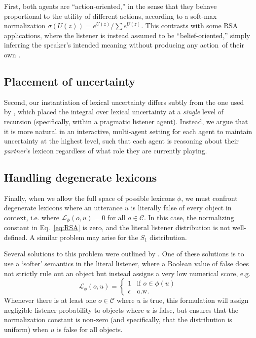 \documentclass[10pt, jou, floatsintext]{apa7}
\begin{document}
First, both agents are ``action-oriented,'' in the sense that they behave proportional to the utility of different actions, according to a soft-max normalization $\sigma(U(z)) = e^{U(z)}/\sum e^{U(z)}$.
This contrasts with some RSA applications, where the listener is instead assumed to be ``belief-oriented,'' simply inferring the speaker's intended meaning without producing any action of their own \cite{qing2015variations}.

\subsection{Placement of uncertainty}

Second, our instantiation of lexical uncertainty differs subtly from the one used by , which placed the integral over lexical uncertainty at a \emph{single} level of recursion (specifically, within a pragmatic listener agent).
Instead, we argue that it is more natural in an interactive, multi-agent setting for each agent to maintain uncertainty at the highest level, such that each agent is reasoning about their \emph{partner}'s lexicon regardless of what role they are currently playing.


\subsection{Handling degenerate lexicons}

Finally, when we allow the full space of possible lexicons $\phi$, we must confront degenerate lexicons where an utterance $u$ is literally false of every object in context, i.e. where $\mathcal{L}_\phi(o, u) = 0$ for all $o\in \mathcal{C}$. 
In this case, the normalizing constant in Eq.~\ref{eq:RSA} is zero, and the literal listener distribution is not well-defined.
A similar problem may arise for the $S_1$ distribution.

Several solutions to this problem were outlined by .
One of these solutions is to use a `softer' semantics in the literal listener, where a Boolean value of false does not strictly rule out an object but instead assigns a very low numerical score, e.g. 
$$\mathcal{L}_\phi(o,u) = \left\{ \begin{array} {rl} 1 & \textrm{if }o \in \phi(u) \\ \epsilon & \textrm{o.w.} \end{array}\right.$$
Whenever there is at least one $o\in\mathcal{C}$ where $u$ is true, this formulation will assign negligible listener probability to objects where $u$ is false, but ensures that the normalization constant is non-zero (and specifically, that the distribution is uniform) when $u$ is false for all objects.
\end{document}
